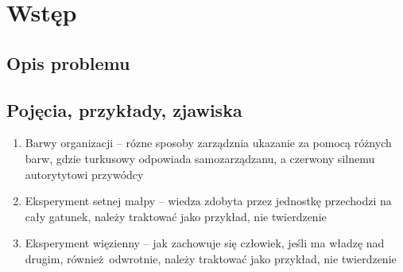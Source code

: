 \documentclass[11pt]{aghdpl}
\author{Mateusz Grzeliński, Kornel Wilk, Mateusz Szymkowski}
\date{2018}
\begin{document}
\titlepages

{
        \fancyhf{}
        \renewcommand{\headrulewidth}{0pt}
        \renewcommand{\footrulewidth}{0pt}
}

\setcounter{tocdepth}{2}
\tableofcontents
\clearpage

\chapter{Wstęp}
\section{Opis problemu}

\section{Pojęcia, przykłady, zjawiska}
\begin{enumerate}
\item Barwy organizacji \cite{ReinventingOrganizations} -- rózne sposoby zarządznia ukazanie za pomocą różnych barw, gdzie turkusowy odpowiada samozarządzanu, a czerwony silnemu autorytytowi przywódcy
\item Eksperyment setnej małpy \cite{EksperymentSetnejMalpy} -- wiedza zdobyta przez jednostkę przechodzi na cały gatunek, należy traktować jako przykład, nie twierdzenie
\item Eksperyment więzienny \cite{EksperymentWiezienny} -- jak zachowuje się człowiek, jeśli ma władzę nad drugim, również odwrotnie, należy traktować jako przykład, nie twierdzenie


\end{enumerate}
\end{document}
